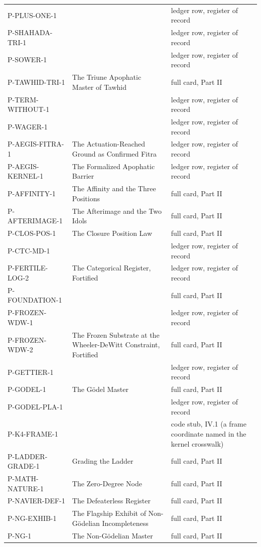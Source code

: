 \documentclass[10pt,twocolumn]{article}
\begin{document}
\begin{center}
\begin{longtable}{>{\raggedright\arraybackslash}p{}>{\raggedright\arraybackslash}p{}>{\raggedright\arraybackslash}p{}}
P-PLUS-ONE-1 &  & ledger row, register of record \\
P-SHAHADA-TRI-1 &  & ledger row, register of record \\
P-SOWER-1 &  & ledger row, register of record \\
P-TAWHID-TRI-1 & The Triune Apophatic Master of Tawhid & full card, Part II \\
P-TERM-WITHOUT-1 &  & ledger row, register of record \\
P-WAGER-1 &  & ledger row, register of record \\
P-AEGIS-FITRA-1 & The Actuation-Reached Ground as Confirmed Fitra & ledger row, register of record \\
P-AEGIS-KERNEL-1 & The Formalized Apophatic Barrier & ledger row, register of record \\
P-AFFINITY-1 & The Affinity and the Three Positions & full card, Part II \\
P-AFTERIMAGE-1 & The Afterimage and the Two Idols & full card, Part II \\
P-CLOS-POS-1 & The Closure Position Law & full card, Part II \\
P-CTC-MD-1 &  & ledger row, register of record \\
P-FERTILE-LOG-2 & The Categorical Register, Fortified & ledger row, register of record \\
P-FOUNDATION-1 &  & full card, Part II \\
P-FROZEN-WDW-1 &  & ledger row, register of record \\
P-FROZEN-WDW-2 & The Frozen Substrate at the Wheeler-DeWitt Constraint, Fortified & full card, Part II \\
P-GETTIER-1 &  & ledger row, register of record \\
P-GODEL-1 & The Gödel Master & full card, Part II \\
P-GODEL-PLA-1 &  & ledger row, register of record \\
P-K4-FRAME-1 &  & code stub, IV.1 (a frame coordinate named in the kernel crosswalk) \\
P-LADDER-GRADE-1 & Grading the Ladder & full card, Part II \\
P-MATH-NATURE-1 & The Zero-Degree Node & full card, Part II \\
P-NAVIER-DEF-1 & The Defeaterless Register & full card, Part II \\
P-NG-EXHIB-1 & The Flagship Exhibit of Non-Gödelian Incompleteness & full card, Part II \\
P-NG-1 & The Non-Gödelian Master & full card, Part II \\

\end{longtable}
\end{center}
\end{document}
